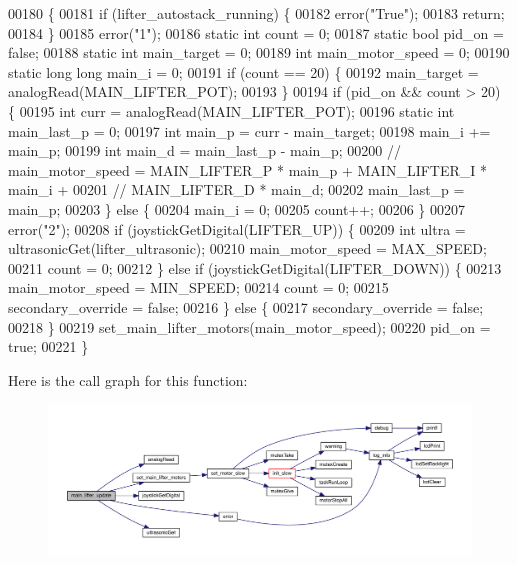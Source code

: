 \begin{DoxyCode}
00180                                  \{
00181   \textcolor{keywordflow}{if} (lifter_autostack_running) \{
00182     error(\textcolor{stringliteral}{"True"});
00183     \textcolor{keywordflow}{return};
00184   \}
00185   error(\textcolor{stringliteral}{"1"});
00186   \textcolor{keyword}{static} \textcolor{keywordtype}{int} count = 0;
00187   \textcolor{keyword}{static} \textcolor{keywordtype}{bool} pid\_on = \textcolor{keyword}{false};
00188   \textcolor{keyword}{static} \textcolor{keywordtype}{int} main\_target = 0;
00189   \textcolor{keywordtype}{int} main\_motor\_speed = 0;
00190   \textcolor{keyword}{static} \textcolor{keywordtype}{long} \textcolor{keywordtype}{long} main\_i = 0;
00191   \textcolor{keywordflow}{if} (count == 20) \{
00192     main\_target = analogRead(MAIN\_LIFTER\_POT);
00193   \}
00194   \textcolor{keywordflow}{if} (pid\_on && count > 20) \{
00195     \textcolor{keywordtype}{int} curr = analogRead(MAIN\_LIFTER\_POT);
00196     \textcolor{keyword}{static} \textcolor{keywordtype}{int} main\_last\_p = 0;
00197     \textcolor{keywordtype}{int} main\_p = curr - main\_target;
00198     main\_i += main\_p;
00199     \textcolor{keywordtype}{int} main\_d = main\_last\_p - main\_p;
00200     \textcolor{comment}{// main\_motor\_speed = MAIN\_LIFTER\_P * main\_p + MAIN\_LIFTER\_I * main\_i +}
00201     \textcolor{comment}{// MAIN\_LIFTER\_D * main\_d;}
00202     main\_last\_p = main\_p;
00203   \} \textcolor{keywordflow}{else} \{
00204     main\_i = 0;
00205     count++;
00206   \}
00207   error(\textcolor{stringliteral}{"2"});
00208   \textcolor{keywordflow}{if} (joystickGetDigital(LIFTER\_UP)) \{
00209     \textcolor{keywordtype}{int} ultra = ultrasonicGet(lifter_ultrasonic);
00210     main\_motor\_speed = MAX\_SPEED;
00211     count = 0;
00212   \} \textcolor{keywordflow}{else} \textcolor{keywordflow}{if} (joystickGetDigital(LIFTER\_DOWN)) \{
00213     main\_motor\_speed = MIN\_SPEED;
00214     count = 0;
00215     secondary_override = \textcolor{keyword}{false};
00216   \} \textcolor{keywordflow}{else} \{
00217     secondary_override = \textcolor{keyword}{false};
00218   \}
00219   set_main_lifter_motors(main\_motor\_speed);
00220   pid\_on = \textcolor{keyword}{true};
00221 \}
\end{DoxyCode}
Here is the call graph for this function\+:
\nopagebreak
\begin{figure}[H]
\begin{center}
\leavevmode
\includegraphics[width=350pt]{lifter_8c_adfb6207ee1f20953058c8de81ec3386a_cgraph}
\end{center}
\end{figure}
